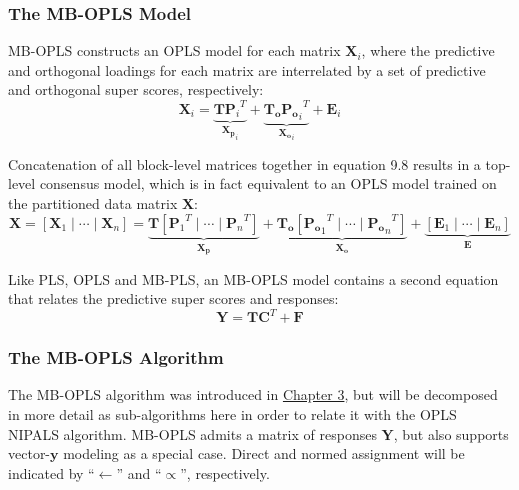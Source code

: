 \subsubsection{The MB-OPLS Model}

\begin{doublespace}
MB-OPLS constructs an OPLS model for each matrix $\mathbf{X}_i$, where the
predictive and orthogonal loadings for each matrix are interrelated by a
set of predictive and orthogonal super scores, respectively:
\begin{equation}
\mathbf{X}_i =
 \underbrace{\mathbf{T} {\mathbf{P}_i}^T}_{\mathbf{X_p}_i} +
 \underbrace{\mathbf{T_o} {\mathbf{P_o}_i}^T}_{\mathbf{X_o}_i} +
 \mathbf{E}_i
\end{equation}

Concatenation of all block-level matrices together in equation 9.8 results
in a top-level consensus model, which is in fact equivalent to an OPLS model
trained on the partitioned data matrix $\mathbf{X}$:
\begin{equation}
\mathbf{X} = [\mathbf{X}_1\mid\cdots\mid\mathbf{X}_n] =
 \underbrace{\mathbf{T} [{\mathbf{P}_1}^T\mid\cdots\mid{\mathbf{P}_n}^T]}
  _{\mathbf{X_p}} +
 \underbrace{\mathbf{T_o} [{\mathbf{P_o}_1}^T\mid\cdots\mid{\mathbf{P_o}_n}^T]}
  _{\mathbf{X_o}} +
 \underbrace{[\mathbf{E}_1\mid\cdots\mid\mathbf{E}_n]}_{\mathbf{E}}
\end{equation}

Like PLS, OPLS and MB-PLS, an MB-OPLS model contains a second equation that
relates the predictive super scores and responses:
\begin{equation}
\mathbf{Y} = \mathbf{T} \mathbf{C}^T + \mathbf{F}
\end{equation}
\end{doublespace}

\subsubsection{The MB-OPLS Algorithm}

\begin{doublespace}
The MB-OPLS algorithm was introduced in
\hyperlink{subsection.3.5.6}{Chapter 3}, but will be decomposed in more
detail as sub-algorithms here in order to relate it with the OPLS NIPALS
algorithm. MB-OPLS admits a matrix of responses $\mathbf{Y}$, but also
supports vector-$\mathbf{y}$ modeling as a special case. Direct and normed
assignment will be indicated by ``$\gets$'' and ``$\propto$'', respectively.
\end{doublespace}

